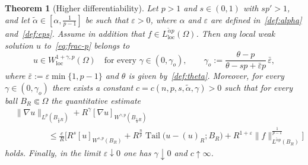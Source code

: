 \documentclass[10pt,letterpaper]{amsart}
\newtheorem{theorem}{Theorem}
\theoremstyle{definition}
\numberwithin{theorem}{section}
\numberwithin{equation}{section}
\newcommand{\1}{\ensuremath{\mathds{1}}}
\renewcommand{\epsilon}{\varepsilon}
\renewcommand{\epsilon}{\varepsilon}
\DeclareMathOperator{\Tail}{Tail}
\numberwithin{equation}{section}
\begin{document}
\begin{theorem}[Higher differentiability]\label{thm:higher-diff}
Let $p>1$ and $s\in(0,1)$ with $sp'>1$, and let $\tilde\alpha\in[\alpha,\frac{1}{p-1}]$ be such that $\epsilon>0$, where $\alpha$ and $\epsilon$ are defined in~\eqref{def:alpha} and~\eqref{def:eps}. Assume in addition that
$f \in L^{\tilde{\alpha}p}_{\mathrm{loc}}(\Omega)$. Then any local weak solution $u$ to~\eqref{eq:frac-p}
belongs to
\begin{equation*}%
u \in W^{1+\gamma,p}_{\mathrm{loc}}(\Omega)
\quad \text{for every } \gamma \in (0,\gamma_o),
\qquad
\gamma_o := \frac{\theta-p}{\theta-sp+\bar\epsilon p}\,\bar\epsilon,
\end{equation*}
where $\bar\epsilon:=\epsilon \min\{1,p-1\}$ and $\theta$ is given by~\eqref{def:theta}.
Moreover, for every $\gamma\in(0,\gamma_o)$ there exists a constant
$c = c(n,p,s,\tilde{\alpha},\gamma)>0$ such that for every ball
$B_R\Subset\Omega$ the quantitative estimate
\begin{align*}
    &\|\nabla u\|_{L^p(B_{\frac12 R})}
    + R^\gamma [\nabla u]_{W^{\gamma,p}(B_{\frac12 R})}\\
    &\qquad\qquad\le
    \frac{c}{R}
    \bigg[
        R^s [u]_{W^{s,p}(B_R)}
        + R^{\frac{n}{p}}
        \Tail\big(u-(u)_{R}; B_R\big)  
        + R^{1+\epsilon}
        \|f\|_{L^{\tilde{\alpha}p}(B_R)}^{\frac{1}{p-1}}
    \bigg]
\end{align*}
holds. Finally, in the limit $\epsilon\downarrow0$ one has
$\gamma\downarrow 0$ and $c\uparrow\infty$.
\end{theorem}
\end{document}
